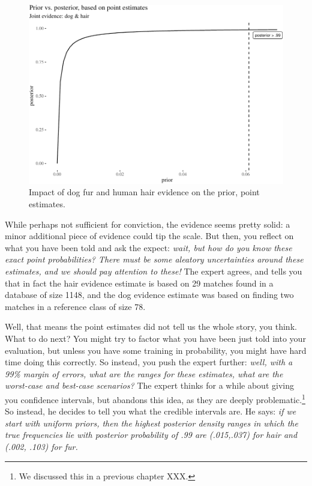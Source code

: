 \documentclass[
  10pt,
  dvipsnames,enabledeprecatedfontcommands]{scrartcl}
\begin{document}
\begin{figure}[H]


\begin{center}\includegraphics[width=0.8\linewidth]{chapter-outline_files/figure-latex/impactOfPoint4-1} \end{center}

\caption{Impact of dog fur and human hair evidence on the prior, point estimates.}

\label{fig:impactOfPoint}

\end{figure}

While perhaps not sufficient for
conviction, the
evidence seems pretty solid: a minor additional piece of evidence could
tip the scale. But then, you reflect on what you have been told and ask
the expect:
\emph{wait, but how do you know these exact point probabilities? There must be some aleatory uncertainties around these estimates, and we should pay attention to these!}
The expert agrees, and tells you that in fact the hair evidence estimate
is based on 29 matches found in a database of size 1148, and the dog
evidence estimate was based on finding two matches in a reference class
of size 78.

Well, that means the point estimates did not tell us the whole story,
you think. What to do next?
You
might try to factor what you have been just told into your evaluation,
but unless you have some training in probability, you might have hard
time doing this correctly. So instead, you push the expert further:
\emph{well, with a 99\% margin of errors, what are the ranges for these estimates, what are the worst-case and best-case scenarios?}
The expert thinks for a while about giving you confidence intervals, but
abandons this idea, as they are deeply problematic.\footnote{We
  discussed this in a previous chapter XXX.} So instead, he decides to
tell you what the credible intervals are. He says:
\emph{if we start with uniform priors, then the  highest posterior density ranges in which the true frequencies lie with posterior probability of .99 are (.015,.037) for hair and (.002, .103) for fur.}
\end{document}
